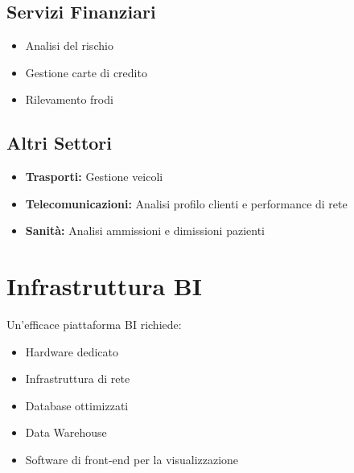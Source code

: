 \section{Servizi Finanziari}
\begin{itemize}
\item Analisi del rischio
\item Gestione carte di credito
\item Rilevamento frodi
\end{itemize}

\section{Altri Settori}
\begin{itemize}
\item \textbf{Trasporti:} Gestione veicoli
\item \textbf{Telecomunicazioni:} Analisi profilo clienti e performance di rete
\item \textbf{Sanità:} Analisi ammissioni e dimissioni pazienti
\end{itemize}

\chapter{Infrastruttura BI}

Un'efficace piattaforma BI richiede:

\begin{itemize}
\item Hardware dedicato
\item Infrastruttura di rete
\item Database ottimizzati
\item Data Warehouse
\item Software di front-end per la visualizzazione
\end{itemize}